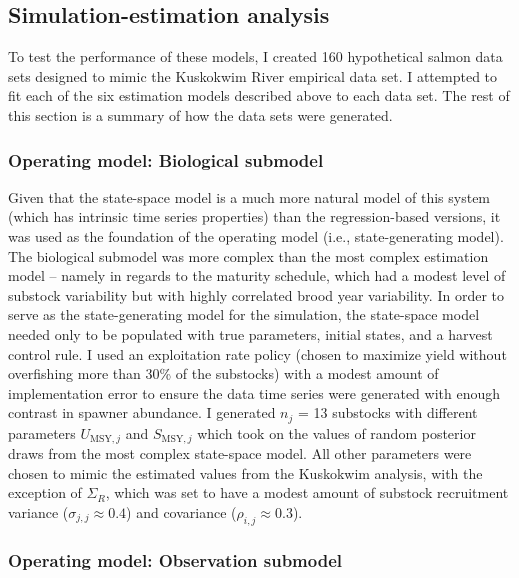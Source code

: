 \documentclass[12pt,]{book}
\theoremstyle{definition}
\theoremstyle{definition}
\theoremstyle{definition}
\theoremstyle{remark}
\begin{document}
\subsection{Simulation-estimation
analysis}\label{simulation-estimation-analysis}

\noindent
To test the performance of these models, I created 160 hypothetical
salmon data sets designed to mimic the Kuskokwim River empirical data
set. I attempted to fit each of the six estimation models described
above to each data set. The rest of this section is a summary of how the
data sets were generated.

\subsubsection{Operating model: Biological
submodel}\label{operating-model-biological-submodel}

\noindent
Given that the state-space model is a much more natural model of this
system (which has intrinsic time series properties) than the
regression-based versions, it was used as the foundation of the
operating model (i.e., state-generating model). The biological submodel
was more complex than the most complex estimation model -- namely in
regards to the maturity schedule, which had a modest level of substock
variability but with highly correlated brood year variability. In order
to serve as the state-generating model for the simulation, the
state-space model needed only to be populated with true parameters,
initial states, and a harvest control rule. I used an exploitation rate
policy (chosen to maximize yield without overfishing more than 30\% of
the substocks) with a modest amount of implementation error to ensure
the data time series were generated with enough contrast in spawner
abundance. I generated \(n_j\) = 13 substocks with different parameters
\(U_{\text{MSY},j}\) and \(S_{\text{MSY},j}\) which took on the values
of random posterior draws from the most complex state-space model. All
other parameters were chosen to mimic the estimated values from the
Kuskokwim analysis, with the exception of \(\Sigma_R\), which was set to
have a modest amount of substock recruitment variance
(\(\sigma_{j,j} \approx 0.4\)) and covariance
(\(\rho_{i,j} \approx 0.3\)).

\subsubsection{Operating model: Observation
submodel}\label{operating-model-observation-submodel}
\end{document}
